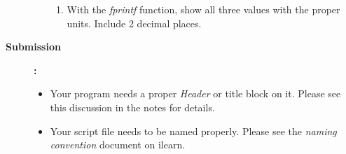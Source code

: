 \documentclass[11pt]{article}
\newcommand{\NUM}{3}
\begin{document}
\begin{description}
\begin{enumerate}
\begin{enumerate}
           \item 
           With the {\it fprintf} function, show all three values with the proper units. Include 2 decimal places.
           
           
             \end{enumerate}
        	\end{enumerate}

\item [\textbf{Submission }]\textbf{:} \\
			\begin{itemize}
				\item Your program needs a proper {\it Header} or title block on it. Please see this discussion in the notes for details.\\
				\item Your script file needs to be named properly. Please see the {\it naming convention} document on ilearn. \\

			\end{itemize}


	\end{description}
 
\end{document}
